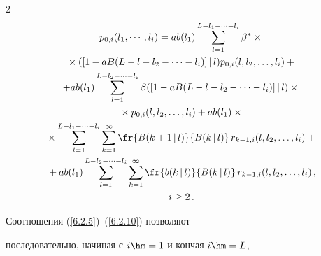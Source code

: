 \begin{multicols}{2}
\begin{multline}


p_{0,i}(l_1,\cdots,l_i)


=a b(l_1)


\sum\limits_{l=1}^{L-l_1-\cdots-l_i}


\beta^*\times{}\\


{}\times([1 - a B(L-l-l_2-\cdots-l_i)]\,|\,l)


p_{0,i}(l,l_2,\ldots,l_i)


 +{}


\\


+a b(l_1)


\sum\limits_{l=1}^{L-l_2-\cdots-l_i}


\beta([1 - a B(L-l-l_2-\cdots-l_i)]\,|\,l)\times{}\\


{}\times


p_{0,i}(l,l_2,\ldots,l_i)


 +a b(l_1)\times{}


\\


{}\times


\sum\limits_{l=1}^{L-l_1-\cdots-l_i}


\sum\limits_{k=1}^\infty


\fr{B(k+1\,|\,l)}{ B(k\,|\,l)}\,


r_{k-1,i}(l,l_2,\ldots,l_i)


 +{}\\


{}+ a b(l_1)


\sum\limits_{l=1}^{L-l_2-\cdots-l_i}


\sum\limits_{k=1}^\infty


\fr{b(k\,|\,l)}{B(k\,|\,l)}\,


r_{k-1,i}(l,l_2,\ldots,l_i)


\,,


\\


  i \ge 2\,.


\label{6.2.10}


\end{multline}





Соотношения (\ref{6.2.5})--(\ref{6.2.10}) позволяют


последовательно, начиная с $i\hm=1$ и кончая $i\hm=L$,



\end{multicols}
